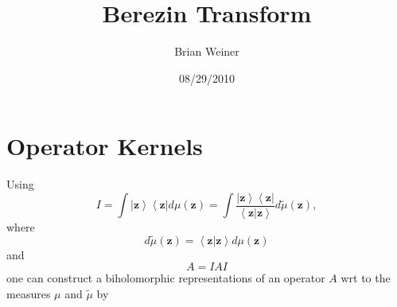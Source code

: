 \documentclass[aps,preprint]{revtex4}%
\begin{document}
\preprint{ }
\title{Berezin Transform}
\author{Brian Weiner}

\begin{abstract}


\end{abstract}
\date{08/29/2010}
\maketitle
\tableofcontents


\section{Operator Kernels}

Using
\begin{equation}
I=\int\left\vert \mathbf{z}\right\rangle \left\langle \mathbf{z}\right\vert
d\mu\left(  \mathbf{z}\right)  =\int\frac{\left\vert \mathbf{z}\right\rangle
\left\langle \mathbf{z}\right\vert }{\left\langle \mathbf{z}\left\vert
\mathbf{z}\right.  \right\rangle }d\tilde{\mu}\left(  \mathbf{z}\right)  ,
\end{equation}
where
\begin{equation}
d\tilde{\mu}\left(  \mathbf{z}\right)  =\left\langle \mathbf{z}\left\vert
\mathbf{z}\right.  \right\rangle d\mu\left(  \mathbf{z}\right)
\end{equation}
and
\begin{equation}
A=IAI
\end{equation}
one can construct a biholomorphic representations of an operator $A$ wrt to
the measures $\mu$ and $\tilde{\mu}$ by
\end{document}

